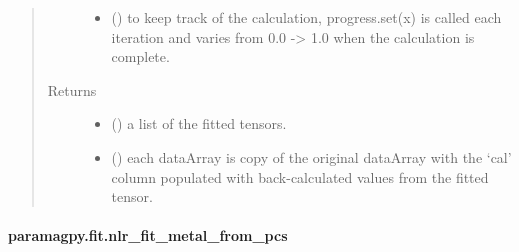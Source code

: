 \documentclass[a4paper,10pt,english,openany,oneside]{sphinxmanual}
\begin{document}
\begin{fulllineitems}
\begin{quote}
\begin{description}
\begin{itemize}
\item {} 
 (\sphinxstyleliteralemphasis{\sphinxupquote{, }}) \textendash{} to keep track of the calculation, progress.set(x) is called each
iteration and varies from 0.0 -\textgreater{} 1.0 when the calculation is complete.

\end{itemize}

\item[{Returns}] \leavevmode
\begin{itemize}
\item {} 
 () \textendash{} a list of the fitted tensors.

\item {} 
 () \textendash{} each dataArray is copy of the original dataArray with
the ‘cal’ column populated with back-calculated values from the
fitted tensor.

\end{itemize}


\end{description}\end{quote}

\end{fulllineitems}



\paragraph{paramagpy.fit.nlr\_fit\_metal\_from\_pcs}
\label{\detokenize{reference/generated/paramagpy.fit.nlr_fit_metal_from_pcs:paramagpy-fit-nlr-fit-metal-from-pcs}}\label{\detokenize{reference/generated/paramagpy.fit.nlr_fit_metal_from_pcs::doc}}
\end{document}
